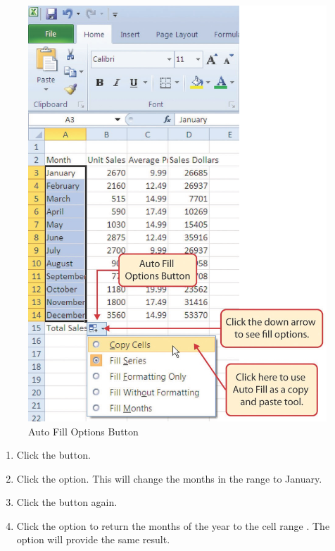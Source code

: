 \begin{figure}[H]
	\centering
	\includegraphics[width=\maxwidth{.95\linewidth}]{gfx/ch01_fig20}
	\caption{Auto Fill Options Button}
	\label{01:fig20}
\end{figure}

\begin{enumbox}
	\begin{enumerate}
		\item Click the  button.
		\item Click the  option. This will change the months in the range  to January.
		\item Click the  button again.
		\item Click the  option to return the months of the year to the cell range . The  option will provide the same result.
	\end{enumerate}
\end{enumbox}

